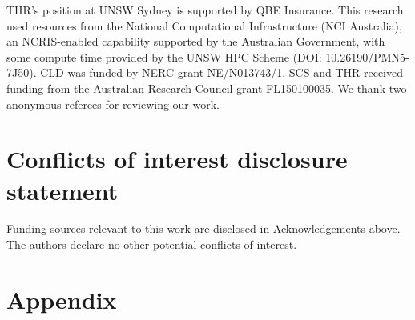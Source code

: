 \documentclass[draft]{agujournal2019}
\begin{document}
\acknowledgments

THR's position at UNSW Sydney is supported by QBE Insurance. This research used
resources from the National Computational Infrastructure (NCI Australia), an
NCRIS-enabled capability supported by the Australian Government, with some
compute time provided by the UNSW HPC Scheme (DOI: 10.26190/PMN5-7J50). CLD was
funded by NERC grant NE/N013743/1. SCS and THR received funding from the
Australian Research Council grant FL150100035. We thank two anonymous referees
for reviewing our work.

\section{Conflicts of interest disclosure statement}

Funding sources relevant to this work are disclosed in Acknowledgements above.
The authors declare no other potential conflicts of interest.



%



\newpage
\section*{Appendix}
\setcounter{figure}{0}
\renewcommand{\thefigure}{A\arabic{figure}}
\end{document}
